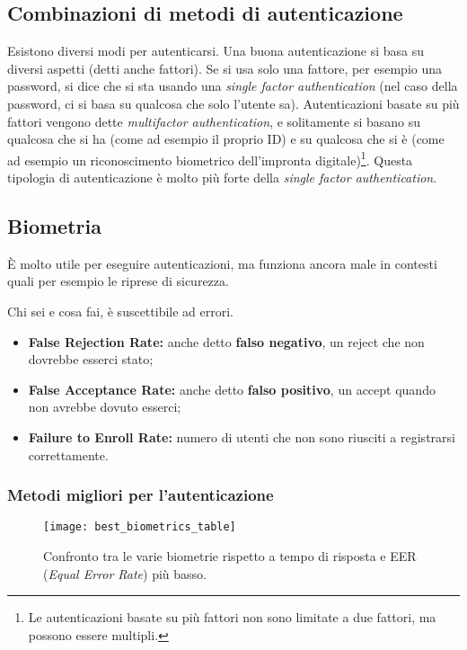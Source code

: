\subsection{Combinazioni di metodi di autenticazione}

Esistono diversi modi per autenticarsi. Una buona autenticazione si basa su
diversi aspetti (detti anche fattori). Se si usa solo una fattore, per esempio
una password, si dice che si sta usando una \textit{single factor
authentication} (nel caso della password, ci si basa su qualcosa che solo
l'utente sa). Autenticazioni basate su più fattori vengono dette
\textit{multifactor authentication}, e solitamente si basano su qualcosa che si
ha (come ad esempio il proprio ID) e su qualcosa che si è (come ad esempio un
riconoscimento biometrico dell'impronta digitale)\footnote{Le autenticazioni
basate su più fattori non sono limitate a due fattori, ma
possono essere multipli.}. Questa tipologia di autenticazione è molto più
forte della \textit{single factor authentication}.

\subsection{Biometria}

È molto utile per eseguire autenticazioni, ma funziona ancora male in contesti
quali per esempio le riprese di sicurezza.

Chi sei e cosa fai, è suscettibile ad errori.

\begin{itemize}
\item \textbf{False Rejection Rate:} anche detto \textbf{falso negativo}, un reject che
non dovrebbe esserci stato;
\item \textbf{False Acceptance Rate:} anche detto \textbf{falso positivo}, un accept
quando non avrebbe dovuto esserci;
\item \textbf{Failure to Enroll Rate:} numero di utenti che non sono riusciti a
registrarsi correttamente.
\end{itemize}

\subsubsection{Metodi migliori per l'autenticazione}

\begin{figure}[H]
 \centering
 \texttt{[image: best\_biometrics\_table]}
 \caption{Confronto tra le varie biometrie rispetto a tempo di risposta e EER
(\emph{Equal Error Rate}) più basso. }
\end{figure}


